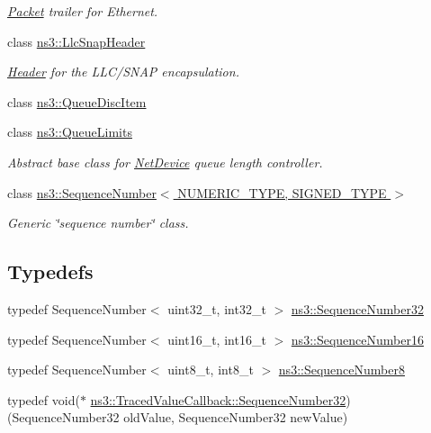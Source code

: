 \begin{DoxyCompactItemize}
\begin{DoxyCompactList}\small\item\em \hyperlink{classns3_1_1Packet}{Packet} trailer for Ethernet. \end{DoxyCompactList}\item 
class \hyperlink{classns3_1_1LlcSnapHeader}{ns3\+::\+Llc\+Snap\+Header}
\begin{DoxyCompactList}\small\item\em \hyperlink{classns3_1_1Header}{Header} for the L\+L\+C/\+S\+N\+AP encapsulation. \end{DoxyCompactList}\item 
class \hyperlink{classns3_1_1QueueDiscItem}{ns3\+::\+Queue\+Disc\+Item}
\item 
class \hyperlink{classns3_1_1QueueLimits}{ns3\+::\+Queue\+Limits}
\begin{DoxyCompactList}\small\item\em Abstract base class for \hyperlink{classns3_1_1NetDevice}{Net\+Device} queue length controller. \end{DoxyCompactList}\item 
class \hyperlink{classns3_1_1SequenceNumber}{ns3\+::\+Sequence\+Number$<$ N\+U\+M\+E\+R\+I\+C\+\_\+\+T\+Y\+P\+E, S\+I\+G\+N\+E\+D\+\_\+\+T\+Y\+P\+E $>$}
\begin{DoxyCompactList}\small\item\em Generic \char`\"{}sequence number\char`\"{} class. \end{DoxyCompactList}\end{DoxyCompactItemize}
\subsection*{Typedefs}
\begin{DoxyCompactItemize}
\item 
typedef Sequence\+Number$<$ uint32\+\_\+t, int32\+\_\+t $>$ \hyperlink{group__network_gacb2070e4e98d2d5135c9bede58f07a03}{ns3\+::\+Sequence\+Number32}
\item 
typedef Sequence\+Number$<$ uint16\+\_\+t, int16\+\_\+t $>$ \hyperlink{group__network_gaf266f5a4c5719a6897638f91ced3b5af}{ns3\+::\+Sequence\+Number16}
\item 
typedef Sequence\+Number$<$ uint8\+\_\+t, int8\+\_\+t $>$ \hyperlink{group__network_ga7897a211607bda13fb584aec87cf78fc}{ns3\+::\+Sequence\+Number8}
\item 
typedef void($\ast$ \hyperlink{group__network_ga27972028fff053ee0921314701d0df61}{ns3\+::\+Traced\+Value\+Callback\+::\+Sequence\+Number32}) (Sequence\+Number32 old\+Value, Sequence\+Number32 new\+Value)
\end{DoxyCompactItemize}


